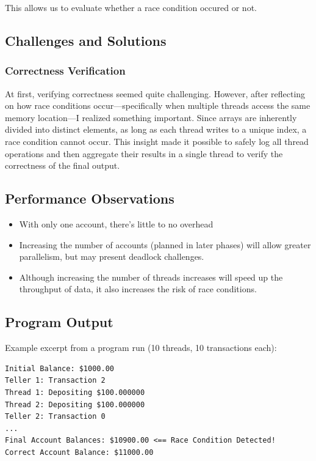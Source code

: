 \documentclass[12pt]{article}
\begin{document}
This allows us to evaluate whether a race condition occured or not.

\subsection{Challenges and Solutions}

\subsubsection{Correctness Verification}
At first, verifying correctness seemed quite challenging. However, after reflecting on how race conditions occur—specifically when multiple threads access the same memory location—I realized something important. Since arrays are inherently divided into distinct elements, as long as each thread writes to a unique index, a race condition cannot occur. This insight made it possible to safely log all thread operations and then aggregate their results in a single thread to verify the correctness of the final output.

\subsection{Performance Observations}
\begin{itemize}
  \item With only one account, there's little to no overhead
  \item Increasing the number of accounts (planned in later phases) will allow greater parallelism, but may present deadlock challenges.
  \item Although increasing the number of threads increases will speed up the throughput of data, it also increases the risk of race conditions.
\end{itemize}

\subsection{Program Output}
Example excerpt from a program run (10 threads, 10 transactions each):

\begin{lstlisting}[caption={Phase 1 Output}]
Initial Balance: $1000.00
Teller 1: Transaction 2
Thread 1: Depositing $100.000000
Thread 2: Depositing $100.000000
Teller 2: Transaction 0
...
Final Account Balances: $10900.00 <== Race Condition Detected!
Correct Account Balance: $11000.00
\end{lstlisting}
\end{document}
